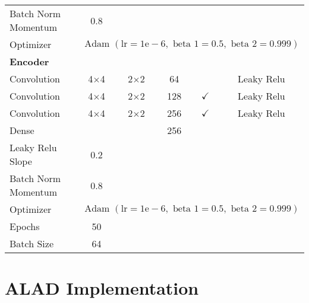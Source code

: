 \begin{longtable}[c]{@{}lccccc@{}}
	Batch Norm Momentum & 0.8 & \multicolumn{1}{l}{} & \multicolumn{1}{l}{} & \multicolumn{1}{l}{} & \multicolumn{1}{l}{} \\
	Optimizer & \multicolumn{5}{l}{$\text { Adam }(\mathrm{lr}=1 \mathrm{e}-6, \text { beta } 1=0.5, \text { beta } 2=0.999)$} \\ \hline
	\multicolumn{6}{l}{\textbf{Encoder}} \\
	Convolution & \multicolumn{1}{c}{4$\times$4} & 2$\times$2 & 64 &  & Leaky Relu \\
	Convolution & \multicolumn{1}{c}{4$\times$4} & 2$\times$2 & 128 & $\checkmark$ & Leaky Relu \\
	Convolution & \multicolumn{1}{c}{4$\times$4} & 2$\times$2 & 256 & $\checkmark$ & Leaky Relu \\
	Dense & \multicolumn{1}{c}{} &  & 256 &  &  \\ \hline
	Leaky Relu Slope & 0.2 & \multicolumn{1}{l}{} & \multicolumn{1}{l}{} & \multicolumn{1}{l}{} & \multicolumn{1}{l}{} \\
	Batch Norm Momentum & 0.8 & \multicolumn{1}{l}{} & \multicolumn{1}{l}{} & \multicolumn{1}{l}{} & \multicolumn{1}{l}{} \\
	Optimizer & \multicolumn{5}{l}{$\text { Adam }(\mathrm{lr}=1 \mathrm{e}-6, \text { beta } 1=0.5, \text { beta } 2=0.999)$} \\ \hline
	Epochs & 50 & \multicolumn{1}{l}{} & \multicolumn{1}{l}{} & \multicolumn{1}{l}{} & \multicolumn{1}{l}{} \\
	Batch Size & 64 & \multicolumn{1}{l}{} & \multicolumn{1}{l}{} & \multicolumn{1}{l}{} & \multicolumn{1}{l}{} \\ \hline 
	
\end{longtable}


\section{ALAD Implementation}
\label{app:alad}

